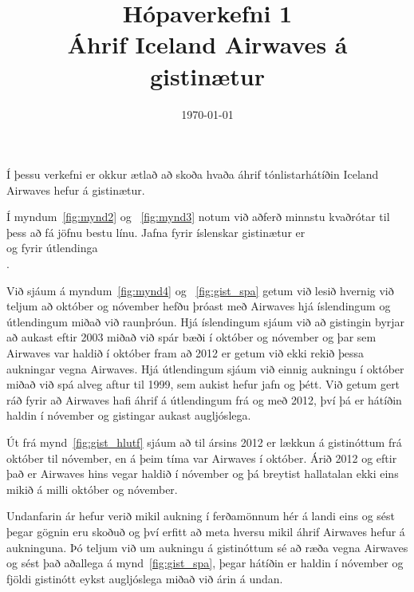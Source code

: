 \documentclass[11pt,a4paper]{amsart}
\theoremstyle{plain}
\theoremstyle{definition}
\theoremstyle{remark}
\begin{document}
\title{Hópaverkefni 1 \\ Áhrif Iceland Airwaves á gistinætur}
\address{School of Computer Science, Reykjavik University,
Menntavegi 1,  \mbox{Reykjavík}, Iceland}
\date{\today}

\maketitle

Í þessu verkefni er okkur ætlað að skoða hvaða áhrif tónlistarhátíðin Iceland Airwaves hefur á gistinætur. \\\par

Í myndum~\ref{fig:mynd2} og ~\ref{fig:mynd3} notum við aðferð minnstu kvaðrótar til þess að fá jöfnu bestu línu. Jafna fyrir íslenskar gistinætur er $$ $$ og fyrir útlendinga $$ $$.

Við sjáum á myndum~\ref{fig:mynd4} og ~\ref{fig:gist_spa} getum við lesið hvernig við teljum að október og nóvember hefðu þróast með Airwaves hjá íslendingum og útlendingum miðað við raunþróun. Hjá íslendingum sjáum við að gistingin byrjar að aukast eftir 2003 miðað við spár bæði í október og nóvember og þar sem Airwaves var haldið í október fram að 2012 er getum við ekki rekið þessa aukningar vegna Airwaves. Hjá útlendingum sjáum við einnig aukningu í október miðað við spá alveg aftur til 1999, sem aukist hefur jafn og þétt. Við getum gert ráð fyrir að Airwaves hafi áhrif á útlendingum frá og með 2012, því þá er hátíðin haldin í nóvember og gistingar aukast augljóslega.

Út frá mynd~\ref{fig:gist_hlutf} sjáum að til ársins 2012 er lækkun á gistinóttum frá október til nóvember, en á þeim tíma var Airwaves í október. Árið 2012 og eftir það er Airwaves hins vegar haldið í nóvember og þá breytist hallatalan ekki eins mikið á milli október og nóvember.\par

Undanfarin ár hefur verið mikil aukning í ferðamönnum hér á landi eins og sést þegar gögnin eru skoðuð og því erfitt að meta hversu mikil áhrif Airwaves hefur á aukninguna. Þó teljum við um aukningu á gistinóttum sé að ræða vegna Airwaves og sést það aðallega á mynd~\ref{fig:gist_spa}, þegar hátíðin er haldin í nóvember og fjöldi gistinótt eykst augljóslega miðað við árin á undan.
\end{document}
